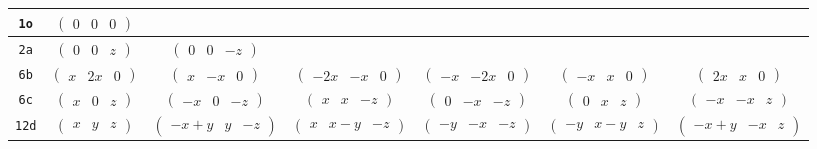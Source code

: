 \documentclass[fleqn,9pt,landscape]{jsarticle}
\begin{document}
\begin{center}
\begin{longtable}{ccccccc}
{\tt 1o} & $ \begin{pmatrix} 0 & 0 & 0 \end{pmatrix} $ & $  $ & $  $ & $  $ & $  $ & $  $ \\ \hline
{\tt 2a} & $ \begin{pmatrix} 0 & 0 & z \end{pmatrix} $ & $ \begin{pmatrix} 0 & 0 & - z \end{pmatrix} $ & $  $ & $  $ & $  $ & $  $ \\ \hline
{\tt 6b} & $ \begin{pmatrix} x & 2 x & 0 \end{pmatrix} $ & $ \begin{pmatrix} x & - x & 0 \end{pmatrix} $ & $ \begin{pmatrix} - 2 x & - x & 0 \end{pmatrix} $ & $ \begin{pmatrix} - x & - 2 x & 0 \end{pmatrix} $ & $ \begin{pmatrix} - x & x & 0 \end{pmatrix} $ & $ \begin{pmatrix} 2 x & x & 0 \end{pmatrix} $ \\ \hline
{\tt 6c} & $ \begin{pmatrix} x & 0 & z \end{pmatrix} $ & $ \begin{pmatrix} - x & 0 & - z \end{pmatrix} $ & $ \begin{pmatrix} x & x & - z \end{pmatrix} $ & $ \begin{pmatrix} 0 & - x & - z \end{pmatrix} $ & $ \begin{pmatrix} 0 & x & z \end{pmatrix} $ & $ \begin{pmatrix} - x & - x & z \end{pmatrix} $ \\ \hline
{\tt 12d} & $ \begin{pmatrix} x & y & z \end{pmatrix} $ & $ \begin{pmatrix} - x + y & y & - z \end{pmatrix} $ & $ \begin{pmatrix} x & x - y & - z \end{pmatrix} $ & $ \begin{pmatrix} - y & - x & - z \end{pmatrix} $ & $ \begin{pmatrix} - y & x - y & z \end{pmatrix} $ & $ \begin{pmatrix} - x + y & - x & z \end{pmatrix} $ \\

\end{longtable}
\end{center}
\end{document}
